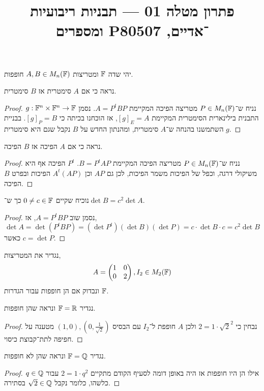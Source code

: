 
\title{פתרון מטלה 01 --- תבניות ריבועיות ומספרים P־אדיים, 80507}



\maketitle
\maketitleprint[red]

\question{}
יהי שדה $\mathbb{F}$ ומטריצות $A, B \in M_n(\mathbb{F})$ חופפות.

\subquestion{}
נראה כי אם $A$ סימטרית אז $B$ סימטרית.
\begin{proof}
	נניח ש־$P \in M_n(\mathbb{F})$ מטריצה הפיכה המקיימת $A = P^t B P$.
	נסמן $g : \mathbb{F}^n \times \mathbb{F}^n \to \mathbb{F}$ התבנית בילינארית הסימטרית המקיימת ${[g]}_E = A$, אז הוכחנו בכיתה כי ${[g]}_P = B$.
	בבניית $g$ השתמשנו בהנחה ש־$A$ סימטרית, ומהנתון החדש על $B$ נקבל שגם היא סימטרית.
\end{proof}

\subquestion{}
נראה כי אם $A$ הפיכה אז $B$ הפיכה.
\begin{proof}
	נניח ש־$P \in M_n(\mathbb{F})$ מטריצה הפיכה המקיימת $B = P^t A P$.
	$P^t$ הפיכה אף היא משיקולי דרגה, וכפל של הפיכות משמר הפיכות, לכן גם $A P$ וכן $ A^t (A P)$ הפיכות ובפרט $B$ הפיכה.
\end{proof}

\subquestion{}
נוכיח שקיים $0 \ne c \in \mathbb{F}$ כך ש־$\det B = c^2 \det A$.
\begin{proof}
	נסמן שוב $A = P^t B P$, אז,
	\[
		\det A
		= \det(P^t B P)
		= (\det P^t) (\det B) (\det P)
		= c \cdot \det B \cdot c
		= c^2 \det B
	\]
	כאשר $c = \det P$.
\end{proof}

\question{}
נגדיר את המטריצות,
\[
	A = \begin{pmatrix}
		1 & 0 \\
		0 & 2
	\end{pmatrix},
	I_2 \in M_2(\mathbb{F})
\]
ונבדוק אם הן חופפות עבור הגדרות $\mathbb{F}$.

\subquestion{}
נגדיר $\mathbb{F} = \mathbb{R}$ ונראה שהן חופפות.
\begin{proof}
	נבחין כי $2 = 1 \cdot \sqrt{2}^2$ ולכן $A$ חופפת ל־$I_2$ עם הבסיס $(1, 0), (0, \frac{1}{\sqrt{2}})$ מטענה על חפיפה לתת־קבוצת כיסוי.
\end{proof}

\subquestion{}
נגדיר $\mathbb{F} = \mathbb{Q}$ ונראה שהן לא חופפות.
\begin{proof}
	אילו הן היו חופפות אז היה באופן דומה לסעיף הקודם מתקיים $2 = 1 \cdot q^2$ עבור $q \in \mathbb{Q}$ כלשהו, כלומר נקבל $\sqrt{2} \in \mathbb{Q}$ בסתירה.
\end{proof}

